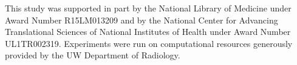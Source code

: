\documentclass[../main.tex]{subfiles}
\begin{document}
This study was supported in part by the National Library of Medicine under Award Number R15LM013209 and by the National Center for Advancing Translational Sciences of National Institutes of Health under Award Number UL1TR002319. Experiments were run on computational resources generously provided by the UW Department of Radiology.
\end{document}
